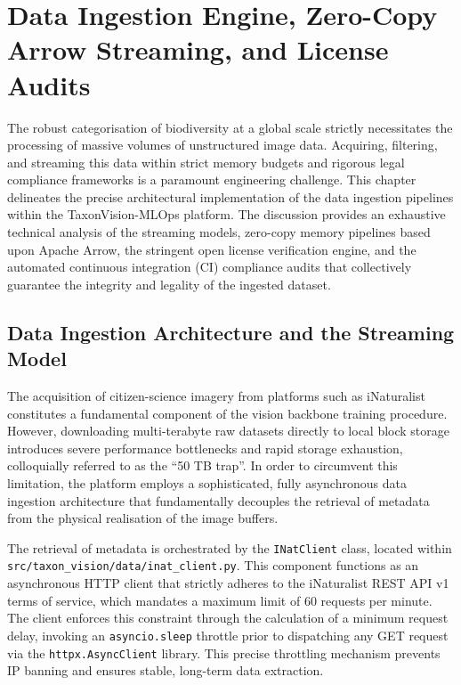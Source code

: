 \chapter{Data Ingestion Engine, Zero-Copy Arrow Streaming, and License Audits}
\label{ch:data_ingestion_engine}

The robust categorisation of biodiversity at a global scale strictly necessitates the processing of massive volumes of unstructured image data. Acquiring, filtering, and streaming this data within strict memory budgets and rigorous legal compliance frameworks is a paramount engineering challenge. This chapter delineates the precise architectural implementation of the data ingestion pipelines within the TaxonVision-MLOps platform. The discussion provides an exhaustive technical analysis of the streaming models, zero-copy memory pipelines based upon Apache Arrow, the stringent open license verification engine, and the automated continuous integration (CI) compliance audits that collectively guarantee the integrity and legality of the ingested dataset.

\section{Data Ingestion Architecture and the Streaming Model}
\label{sec:data_ingestion_architecture}

The acquisition of citizen-science imagery from platforms such as iNaturalist constitutes a fundamental component of the vision backbone training procedure. However, downloading multi-terabyte raw datasets directly to local block storage introduces severe performance bottlenecks and rapid storage exhaustion, colloquially referred to as the ``50 TB trap''. In order to circumvent this limitation, the platform employs a sophisticated, fully asynchronous data ingestion architecture that fundamentally decouples the retrieval of metadata from the physical realisation of the image buffers.

The retrieval of metadata is orchestrated by the \texttt{INatClient} class, located within\\\texttt{src/taxon\_vision/data/inat\_client.py}. This component functions as an asynchronous HTTP client that strictly adheres to the iNaturalist REST API v1 terms of service, which mandates a maximum limit of 60 requests per minute. The client enforces this constraint through the calculation of a minimum request delay, invoking an \texttt{asyncio.sleep} throttle prior to dispatching any GET request via the \texttt{httpx.AsyncClient} library. This precise throttling mechanism prevents IP banning and ensures stable, long-term data extraction.

